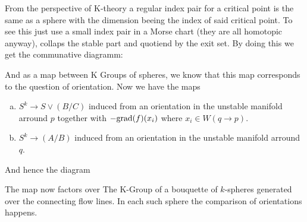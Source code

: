 \begin{Iprove}
	From the perspective of K-theory a regular index pair for a critical point is the same as a sphere with the dimension beeing the index of said critical point. To see this just use a small index pair in a Morse chart (they are all homotopic anyway), collaps the stable part and quotiend by the exit set. By doing this we get the communative diagramm:
	\begin{center}
	\end{center} And as a map between K Groups of spheres, we know that this map corresponds to the question of orientation. Now we have the maps 
	\begin{enumerate}[(a)]
		\item $S^k\to S\vee (B\big/ C)$ induced from an orientation in the unstable manifold arround $p$ together with $-\mathrm{grad}(f)(x_i)$ where $x_i\in W(q\to p)$. 
		\item $S^k \to (A\big/ B)$ induced from an orientation in the unstable manifold arround $q$. 
	\end{enumerate}
	And hence the diagram 
	\begin{center}
	\end{center}
	The map now factors over The K-Group of a bouquette of $k$-spheres generated over the connecting flow lines. In each such sphere the comparison of orientations happens.
\end{Iprove}

